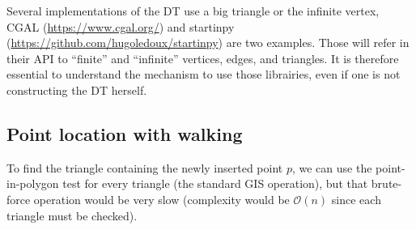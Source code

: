 %

\begin{floatbox}
\begin{kaobox-practice}[frametitle=\faCog\ How are DT created in practice?]
Several implementations of the DT use a big triangle or the infinite vertex,  CGAL (\url{https://www.cgal.org/}) and startinpy (\url{https://github.com/hugoledoux/startinpy}) are two examples.
Those will refer in their API to ``finite'' and ``infinite'' vertices, edges, and triangles.
It is therefore essential to understand the mechanism to use those librairies, even if one is not constructing the DT herself.
\end{kaobox-practice}
\end{floatbox}


\subsection{Point location with walking}%
\label{sec:dtwalk}

To find the triangle containing the newly inserted point $p$, we can use the point-in-polygon test for every triangle (the standard GIS operation), but that brute-force operation would be very slow (complexity would be $\mathcal{O}(n)$ since each triangle must be checked).

